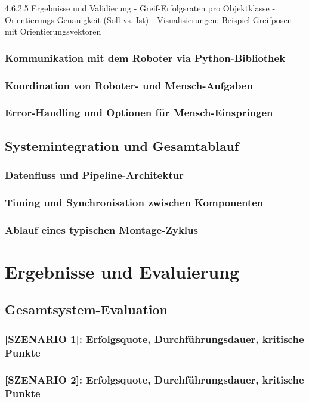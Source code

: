 \documentclass[12pt]{article}
\begin{document}
 4.6.2.5 Ergebnisse und Validierung
- Greif-Erfolgsraten pro Objektklasse
- Orientierungs-Genauigkeit (Soll vs. Ist)
- Visualisierungen: Beispiel-Greifposen mit Orientierungsvektoren

    \subsubsection{Kommunikation mit dem Roboter via Python-Bibliothek}
    \subsubsection{Koordination von Roboter- und Mensch-Aufgaben}
    \subsubsection{Error-Handling und Optionen für Mensch-Einspringen}

\subsection{Systemintegration und Gesamtablauf}
    \subsubsection{Datenfluss und Pipeline-Architektur}
    \subsubsection{Timing und Synchronisation zwischen Komponenten}
    \subsubsection{Ablauf eines typischen Montage-Zyklus}


\newpage


\section{Ergebnisse und Evaluierung}

\subsection{Gesamtsystem-Evaluation}
    \subsubsection{[SZENARIO 1]: Erfolgsquote, Durchführungsdauer, kritische Punkte}
    \subsubsection{[SZENARIO 2]: Erfolgsquote, Durchführungsdauer, kritische Punkte}
\end{document}
